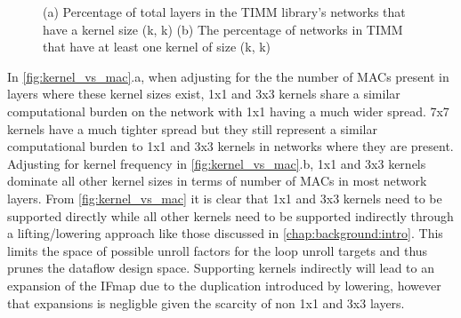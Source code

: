 \clearpage
\begin{figure}
    \centering
    \caption{(a) Percentage of total layers in the TIMM library's networks that have a kernel size (k, k) (b) The percentage of networks in TIMM that have at least one kernel of size (k, k)}
    \label{fig:kernel_stats:freq}
\end{figure}


In \autoref{fig:kernel_vs_mac}.a, when adjusting for the the number of MACs
present in layers where these kernel sizes exist, 1x1 and 3x3 kernels share a
similar computational burden on the network with 1x1 having a much wider spread.
7x7 kernels have a much tighter spread but they still represent a similar
computational burden to 1x1 and 3x3 kernels in networks where they are present.
Adjusting for kernel frequency in \autoref{fig:kernel_vs_mac}.b, 1x1 and 3x3
kernels dominate all other kernel sizes in terms of number of MACs in most
network layers. From \autoref{fig:kernel_vs_mac} it is clear that 1x1 and 3x3
kernels need to be supported directly while all other kernels need to be
supported indirectly through a lifting/lowering approach like those discussed in
\autoref{chap:background:intro}. This limits the space of possible unroll
factors for the loop unroll targets and thus prunes the dataflow design space.
Supporting kernels indirectly will lead to an expansion of the IFmap due to the
duplication introduced by lowering, however that expansions is negligble given
the scarcity of non 1x1 and 3x3 layers. 

